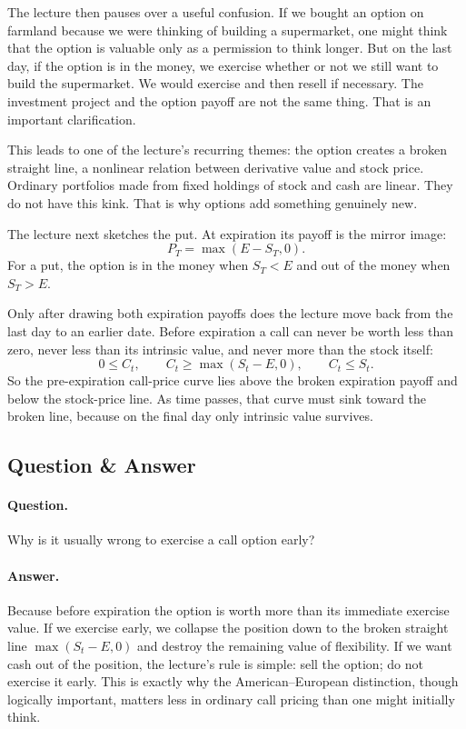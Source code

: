 The lecture then pauses over a useful confusion. If we bought an option on farmland because we were thinking of building a supermarket, one might think that the option is valuable only as a permission to think longer. But on the last day, if the option is in the money, we exercise whether or not we still want to build the supermarket. We would exercise and then resell if necessary. The investment project and the option payoff are not the same thing. That is an important clarification.

This leads to one of the lecture's recurring themes: the option creates a broken straight line, a nonlinear relation between derivative value and stock price. Ordinary portfolios made from fixed holdings of stock and cash are linear. They do not have this kink. That is why options add something genuinely new.

The lecture next sketches the put. At expiration its payoff is the mirror image:
\begin{equation}
P_T=\max(E-S_T,0).
\end{equation}
For a put, the option is in the money when $S_T<E$ and out of the money when $S_T>E$.

Only after drawing both expiration payoffs does the lecture move back from the last day to an earlier date. Before expiration a call can never be worth less than zero, never less than its intrinsic value, and never more than the stock itself:
\begin{equation}
0\le C_t,\qquad C_t\ge \max(S_t-E,0),\qquad C_t\le S_t.
\end{equation}
So the pre-expiration call-price curve lies above the broken expiration payoff and below the stock-price line. As time passes, that curve must sink toward the broken line, because on the final day only intrinsic value survives.

\subsection{Question \& Answer}

\paragraph{Question.} Why is it usually wrong to exercise a call option early?

\paragraph{Answer.} Because before expiration the option is worth more than its immediate exercise value. If we exercise early, we collapse the position down to the broken straight line $\max(S_t-E,0)$ and destroy the remaining value of flexibility. If we want cash out of the position, the lecture's rule is simple: sell the option; do not exercise it early. This is exactly why the American--European distinction, though logically important, matters less in ordinary call pricing than one might initially think.

